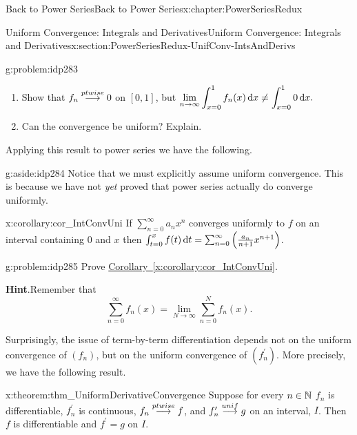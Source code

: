 \begin{chapterptx}{Back to Power Series}{}{Back to Power Series}{}{}{x:chapter:PowerSeriesRedux}
\begin{sectionptx}{Uniform Convergence: Integrals and Derivatives}{}{Uniform Convergence: Integrals and Derivatives}{}{}{x:section:PowerSeriesRedux-UnifConv-IntsAndDerivs}
\begin{introduction}{}
\begin{problem}{}{g:problem:idp283}
\begin{equation*}
				\end{equation*}
				\begin{enumerate}[label=(\alph*)]
					\item{}Show that \(f_n\stackrel{ptwise}{\longrightarrow} 0\) on \([0,1]\), but \({\displaystyle\lim_{n\rightarrow \infty}\int_{x=0}^1f_n(x)\,{\rm d} x\neq\int_{x=0}^10\,{\rm d} x.}\)%
					\item{}Can the convergence be uniform? Explain.%
				\end{enumerate}
			\end{problem}
			Applying this result to power series we have the following.%
			\begin{aside}{}{g:aside:idp284}%
				Notice that we must explicitly assume uniform convergence. This is because we have not \emph{yet} proved that power series actually do converge uniformly.%
			\end{aside}
			\begin{corollary}{}{}{x:corollary:cor_IntConvUni}%
				If \(\sum_{n=0}^\infty a_nx^n\) converges uniformly to \(f\) on an interval containing \(0\) and \(x\) then \(\int_{t=0}^xf(t)\,{\rm d} t=\sum_{n=0}^\infty\left(\frac{a_n}{n+1}x^{n+1}\right)\).%
			\end{corollary}
			\begin{problem}{}{g:problem:idp285}%
				 Prove \hyperref[x:corollary:cor_IntConvUni]{Corollary~{\xreffont\ref{x:corollary:cor_IntConvUni}}}.%
				\par\smallskip%
				\noindent\textbf{\blocktitlefont Hint}.\hypertarget{g:hint:idp286}{}\quad{}Remember that%
				\begin{equation*}
					\displaystyle \sum_{n=0}^\infty f_n(x) = \lim_{N\rightarrow\infty}\sum_{n=0}^N f_n(x). 
				\end{equation*}
			\end{problem}
			Surprisingly, the issue of term-by-term differentiation depends not on the uniform convergence of \(\left(f_n\right)\), but on the uniform convergence of \(\left(f^\prime_n\right)\). More precisely, we have the following result.%
			\begin{theorem}{}{}{x:theorem:thm_UniformDerivativeConvergence}%
				Suppose for every \(n\in\mathbb {N}\) \(f_n\) is differentiable, \(f_n^\prime\) is continuous, \(f_n\stackrel{ptwise}{\longrightarrow} f\), and \(f_n^\prime\stackrel{unif}{\longrightarrow} g\) on an interval, \(I\).  Then \(f\) is differentiable and \(f^\prime = g\) on \(I\).%
			\end{theorem}

\end{introduction}
\end{sectionptx}
\end{chapterptx}
